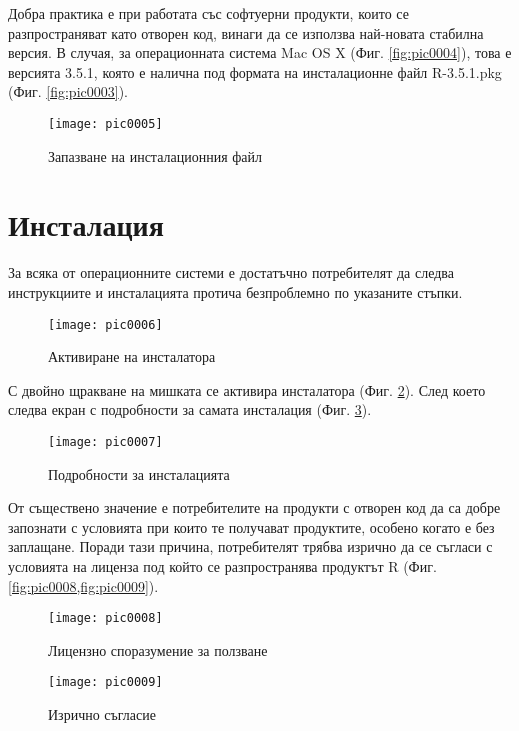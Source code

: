 Добра практика е при работата със софтуерни продукти, които се разпространяват като отворен код, винаги да се използва най-новата стабилна версия. В случая, за операционната система Mac OS X (Фиг. \ref{fig:pic0004}), това е версията 3.5.1, която е налична под формата на инсталационне файл R-3.5.1.pkg (Фиг. \ref{fig:pic0003}).

\begin{figure}[h]
  \centering
  \texttt{[image: pic0005]}
  \caption{Запазване на инсталационния файл}
\label{fig:pic0005}
\end{figure}
\FloatBarrier

\section{Инсталация}

За всяка от операционните системи е достатъчно потребителят да следва инструкциите и инсталацията протича безпроблемно по указаните стъпки. 

\begin{figure}[h]
  \centering
  \texttt{[image: pic0006]}
  \caption{Активиране на инсталатора}
\label{fig:pic0006}
\end{figure}
\FloatBarrier

С двойно щракване на мишката се активира инсталатора (Фиг. \ref{fig:pic0006}). След което следва екран с подробности за самата инсталация (Фиг. \ref{fig:pic0007}).

\begin{figure}[h]
  \centering
  \texttt{[image: pic0007]}
  \caption{Подробности за инсталацията}
\label{fig:pic0007}
\end{figure}
\FloatBarrier

От съществено значение е потребителите на продукти с отворен код да са добре запознати с условията при които те получават продуктите, особено когато е без заплащане. Поради тази причина, потребителят трябва изрично да се съгласи с условията на лиценза под който се разпространява продуктът R (Фиг. \ref{fig:pic0008,fig:pic0009}).

\begin{figure}[h]
  \centering
  \texttt{[image: pic0008]}
  \caption{Лицензно споразумение за ползване}
\label{fig:pic0008}
\end{figure}
\FloatBarrier

\begin{figure}[h]
  \centering
  \texttt{[image: pic0009]}
  \caption{Изрично съгласие}
\label{fig:pic0009}
\end{figure}
\FloatBarrier

